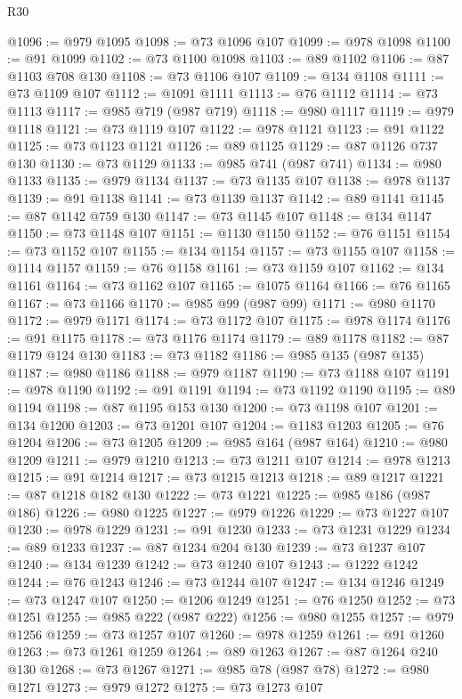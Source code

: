 \begin{lexlean}{R30}
\begin{coremodule}
{{{{{@1096 := @979 @1095
@1098 := @73 @1096 @107
@1099 := @978 @1098
@1100 := @91 @1099
@1102 := @73 @1100 @1098
@1103 := @89 @1102
@1106 := @87 @1103 @708 @130
@1108 := @73 @1106 @107
@1109 := @134 @1108
@1111 := @73 @1109 @107
@1112 := @1091 @1111
@1113 := @76 @1112
@1114 := @73 @1113
@1117 := @985 @719 (@987 @719)
@1118 := @980 @1117
@1119 := @979 @1118
@1121 := @73 @1119 @107
@1122 := @978 @1121
@1123 := @91 @1122
@1125 := @73 @1123 @1121
@1126 := @89 @1125
@1129 := @87 @1126 @737 @130
@1130 := @73 @1129
@1133 := @985 @741 (@987 @741)
@1134 := @980 @1133
@1135 := @979 @1134
@1137 := @73 @1135 @107
@1138 := @978 @1137
@1139 := @91 @1138
@1141 := @73 @1139 @1137
@1142 := @89 @1141
@1145 := @87 @1142 @759 @130
@1147 := @73 @1145 @107
@1148 := @134 @1147
@1150 := @73 @1148 @107
@1151 := @1130 @1150
@1152 := @76 @1151
@1154 := @73 @1152 @107
@1155 := @134 @1154
@1157 := @73 @1155 @107
@1158 := @1114 @1157
@1159 := @76 @1158
@1161 := @73 @1159 @107
@1162 := @134 @1161
@1164 := @73 @1162 @107
@1165 := @1075 @1164
@1166 := @76 @1165
@1167 := @73 @1166
@1170 := @985 @99 (@987 @99)
@1171 := @980 @1170
@1172 := @979 @1171
@1174 := @73 @1172 @107
@1175 := @978 @1174
@1176 := @91 @1175
@1178 := @73 @1176 @1174
@1179 := @89 @1178
@1182 := @87 @1179 @124 @130
@1183 := @73 @1182
@1186 := @985 @135 (@987 @135)
@1187 := @980 @1186
@1188 := @979 @1187
@1190 := @73 @1188 @107
@1191 := @978 @1190
@1192 := @91 @1191
@1194 := @73 @1192 @1190
@1195 := @89 @1194
@1198 := @87 @1195 @153 @130
@1200 := @73 @1198 @107
@1201 := @134 @1200
@1203 := @73 @1201 @107
@1204 := @1183 @1203
@1205 := @76 @1204
@1206 := @73 @1205
@1209 := @985 @164 (@987 @164)
@1210 := @980 @1209
@1211 := @979 @1210
@1213 := @73 @1211 @107
@1214 := @978 @1213
@1215 := @91 @1214
@1217 := @73 @1215 @1213
@1218 := @89 @1217
@1221 := @87 @1218 @182 @130
@1222 := @73 @1221
@1225 := @985 @186 (@987 @186)
@1226 := @980 @1225
@1227 := @979 @1226
@1229 := @73 @1227 @107
@1230 := @978 @1229
@1231 := @91 @1230
@1233 := @73 @1231 @1229
@1234 := @89 @1233
@1237 := @87 @1234 @204 @130
@1239 := @73 @1237 @107
@1240 := @134 @1239
@1242 := @73 @1240 @107
@1243 := @1222 @1242
@1244 := @76 @1243
@1246 := @73 @1244 @107
@1247 := @134 @1246
@1249 := @73 @1247 @107
@1250 := @1206 @1249
@1251 := @76 @1250
@1252 := @73 @1251
@1255 := @985 @222 (@987 @222)
@1256 := @980 @1255
@1257 := @979 @1256
@1259 := @73 @1257 @107
@1260 := @978 @1259
@1261 := @91 @1260
@1263 := @73 @1261 @1259
@1264 := @89 @1263
@1267 := @87 @1264 @240 @130
@1268 := @73 @1267
@1271 := @985 @78 (@987 @78)
@1272 := @980 @1271
@1273 := @979 @1272
@1275 := @73 @1273 @107
}}}}}
\end{coremodule}
\end{lexlean}
